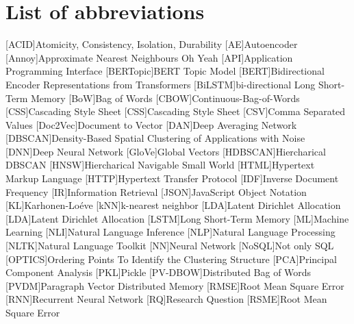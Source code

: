 \chapter*{List of abbreviations}


\begin{acronym}[XXXXXXXXX]
    [ACID]{Atomicity, Consistency, Isolation, Durability}
    [AE]{Autoencoder}
    [Annoy]{Approximate Nearest Neighbours Oh Yeah}
    [API]{Application Programming Interface}
    [BERTopic]{BERT Topic Model}
    [BERT]{Bidirectional Encoder Representations from Transformers}
    [BiLSTM]{bi-directional Long Short-Term Memory}
    [BoW]{Bag of Words}
    [CBOW]{Continuous-Bag-of-Words}
    [CSS]{Cascading Style Sheet}
    [CSS]{Cascading Style Sheet}
    [CSV]{Comma Separated Values}
    [Doc2Vec]{Document to Vector}
    [DAN]{Deep Averaging Network}
    [DBSCAN]{Density-Based Spatial Clustering of Applications with Noise}
    [DNN]{Deep Neural Network}
    [GloVe]{Global Vectors}
    [HDBSCAN]{Hiercharical DBSCAN}
    [HNSW]{Hiercharical Navigable Small World}
    [HTML]{Hypertext Markup Language}
    [HTTP]{Hypertext Transfer Protocol}
    [IDF]{Inverse Document Frequency}
    [IR]{Information Retrieval}
    [JSON]{JavaScript Object Notation}
    [KL]{Karhonen-Loéve}
    [kNN]{k-nearest neighbor}
    [LDA]{Latent Dirichlet Allocation}
    [LDA]{Latent Dirichlet Allocation}
    [LSTM]{Long Short-Term Memory}
    [ML]{Machine Learning}
    [NLI]{Natural Language Inference}
    [NLP]{Natural Language Processing}
    [NLTK]{Natural Language Toolkit}
    [NN]{Neural Network}
    [NoSQL]{Not only SQL}
    [OPTICS]{Ordering Points To Identify the Clustering Structure}
    [PCA]{Principal Component Analysis}
    [PKL]{Pickle}
    [PV-DBOW]{Distributed Bag of Words}
    [PVDM]{Paragraph Vector Distributed Memory}
    [RMSE]{Root Mean Square Error}
    [RNN]{Recurrent Neural Network}
    [RQ]{Research Question}
    [RSME]{Root Mean Square Error}

\end{acronym}
